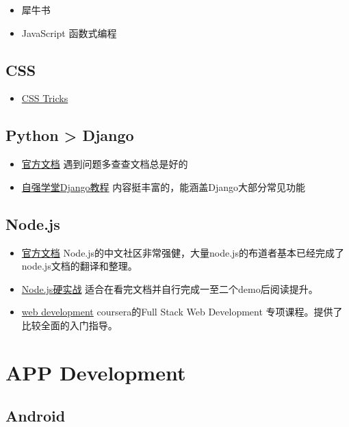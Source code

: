 \documentclass{ctexart}
\begin{document}
\begin{itemize}
\item 犀牛书
\item JavaScript 函数式编程
\end{itemize}

\subsection{CSS}
\begin{itemize}
\item \href{https://css-tricks.com/}{CSS Tricks}
\end{itemize}

\subsection{Python > Django}
\begin{itemize}
\item \href{https://docs.djangoproject.com/}{官方文档} 遇到问题多查查文档总是好的
\item \href{https://code.ziqiangxuetang.com/django/django-tutorial.html}{自强学堂Django教程} 内容挺丰富的，能涵盖Django大部分常见功能
\end{itemize}

\subsection{Node.js}

\begin{itemize}
\item \href{https://nodejs.org/en/}{官方文档} Node.js的中文社区非常强健，大量node.js的布道者基本已经完成了node.js文档的翻译和整理。
\item \href{https://book.douban.com/subject/26937390/}{Node.js硬实战} 适合在看完文档并自行完成一至二个demo后阅读提升。
\item \href{https://www.coursera.org/specializations/full-stack-mobile-app-development}{web development} coursera的Full Stack Web Development 专项课程。提供了比较全面的入门指导。
\end{itemize}

\section{APP Development}

\subsection{Android}
\end{document}
